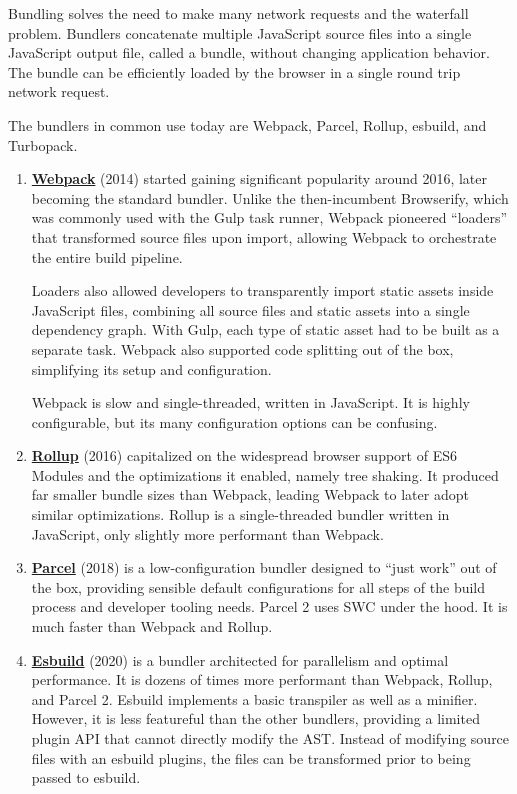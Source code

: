 \documentclass{article}
\begin{document}
Bundling solves the need to make many network requests and the waterfall problem. Bundlers
concatenate multiple JavaScript source files into a single JavaScript output file, called a bundle,
without changing application behavior. The bundle can be efficiently loaded by the browser in a
single round trip network request.

The bundlers in common use today are Webpack, Parcel, Rollup, esbuild, and Turbopack.

\begin{enumerate}
  \item \href{https://webpack.js.org/}{\textbf{Webpack}} (2014) started gaining significant
    popularity around 2016, later becoming the standard bundler. Unlike the then-incumbent
    Browserify, which was commonly used with the Gulp task runner, Webpack pioneered ``loaders'' that
    transformed source files upon import, allowing Webpack to orchestrate the entire build pipeline.

    Loaders also allowed developers to transparently import static assets inside JavaScript files,
    combining all source files and static assets into a single dependency graph. With Gulp, each
    type of static asset had to be built as a separate task. Webpack also supported code splitting
    out of the box, simplifying its setup and configuration.

    Webpack is slow and single-threaded, written in JavaScript. It is highly configurable, but its
    many configuration options can be confusing.

  \item \href{https://rollupjs.org/}{\textbf{Rollup}} (2016) capitalized on the widespread browser
    support of ES6 Modules and the optimizations it enabled, namely tree shaking. It produced far
    smaller bundle sizes than Webpack, leading Webpack to later adopt similar optimizations. Rollup
    is a single-threaded bundler written in JavaScript, only slightly more performant than Webpack.

  \item \href{https://parceljs.org/}{\textbf{Parcel}} (2018) is a low-configuration bundler designed
    to ``just work'' out of the box, providing sensible default configurations for all steps of the
    build process and developer tooling needs. Parcel 2 uses SWC under the hood. It is much faster
    than Webpack and Rollup.

  \item \href{https://esbuild.github.io/}{\textbf{Esbuild}} (2020) is a bundler architected for
    parallelism and optimal performance. It is dozens of times more performant than Webpack, Rollup,
    and Parcel 2. Esbuild implements a basic transpiler as well as a minifier. However, it is less
    featureful than the other bundlers, providing a limited plugin API that cannot directly modify
    the AST. Instead of modifying source files with an esbuild plugins, the files can be transformed
    prior to being passed to esbuild.


\end{enumerate}
\end{document}
